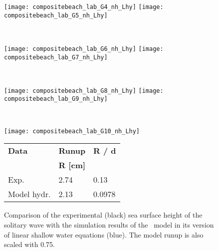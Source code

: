\begin{figure}[htbp]
\begin{minipage}{\textwidth}
\texttt{[image: compositebeach\_lab\_G4\_nh\_Lhy]}
\texttt{[image: compositebeach\_lab\_G5\_nh\_Lhy]}
\end{minipage} \\
\begin{minipage}{\textwidth}
\texttt{[image: compositebeach\_lab\_G6\_nh\_Lhy]}
\texttt{[image: compositebeach\_lab\_G7\_nh\_Lhy]}
\end{minipage} \\
\begin{minipage}{\textwidth}
\texttt{[image: compositebeach\_lab\_G8\_nh\_Lhy]}
\texttt{[image: compositebeach\_lab\_G9\_nh\_Lhy]}
\end{minipage} \\
\begin{minipage}{0.48\textwidth}
\texttt{[image: compositebeach\_lab\_G10\_nh\_Lhy]}
\end{minipage} 
\begin{minipage}{0.45\textwidth}
\begin{tabular}{lll}
\textbf{Data} & \textbf{Runup} & \textbf{R / d} \\
              & \textbf{R [cm]} &  \\
\toprule
Exp.  &  2.74   &  0.13 \\
Model hydr. &  2.13   &  0.0978 \\
\end{tabular}
\end{minipage}
\caption{Comparison of the experimental (black) sea surface height of the
solitary wave with the simulation results of the \nh\ model in its version of linear shallow water equations (blue). The model runup is also scaled with 0.75.}
\label{fig:nh_compositebeach_lab_nh_Lhy}
\end{figure}



